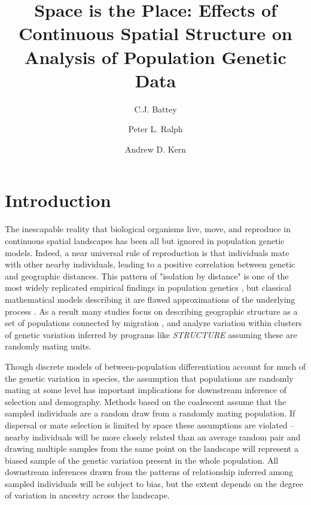 \documentclass[11pt,twoside,lineno]{preprint}
\title{Space is the Place: Effects of Continuous Spatial Structure on Analysis of Population Genetic Data}
\author[$\ast$,1]{C.J. Battey}
\author[$\ast$]{Peter L. Ralph}
\author[$\ast$]{Andrew D. Kern}
\affil[$\ast$]{University of Oregon Dept. Biology, Institute for Ecology Evolution}
\begin{document}
\maketitle
\thispagestyle{firststyle}
\firstpagefootnote


\vspace{-35pt}%

\section{Introduction}
The inescapable reality that biological organisms live, move, and reproduce in continuous spatial landscapes has been all but ignored in population genetic models. Indeed, a near universal rule of reproduction is that individuals mate with other nearby individuals, leading to a positive correlation between genetic and geographic distances. This pattern of "isolation by distance" \citep{Wright1943} is one of the most widely replicated empirical findings in population genetics \citep{Chen2017,Jay2012,Sharbel2000}, but classical mathematical models describing it are flawed approximations of the underlying process \citep{Felsenstein1975}.
As a result many studies focus on describing geographic structure as a set of populations connected by migration \citep{Malecot1948,Wright1931}, and analyze variation within clusters of genetic variation inferred by programs like \textit{STRUCTURE} \citep{Pritchard2000} assuming these are randomly mating units. 

Though discrete models of between-population differentiation account for much of the genetic variation in species, the assumption that populations are randomly mating at some level has important implications for downstream inference of selection and demography. Methods based on the coalescent \citep{Kingman1982} assume that the sampled individuals are a random draw from a randomly mating population. If dispersal or mate selection is limited by space these assumptions are violated -- nearby individuals will be more closely related than an average random pair and drawing multiple samples from the same point on the landscape will represent a biased sample of the genetic variation present in the whole population. All downstream inferences drawn from the patterns of relationship inferred among sampled individuals will be subject to bias, but the extent depends on the degree of variation in ancestry across the landscape. 
\end{document}
